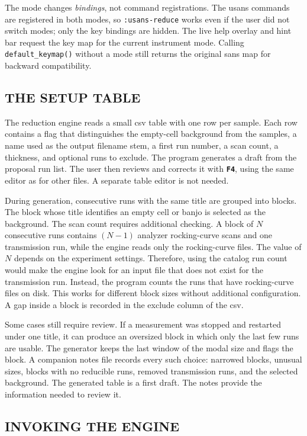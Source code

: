 \documentclass[tm]{ornltm}
\newcommand{\key}[1]{\textbf{\texttt{#1}}}
\begin{document}
The mode changes \emph{bindings}, not command registrations. The \ac{usans}
commands are registered in both modes, so \texttt{:usans-reduce} works even if
the user did not switch modes; only the key bindings are hidden. The live help
overlay and hint bar request the key map for the current instrument mode.
Calling \texttt{default\_keymap()} without a mode still returns the original
\ac{sans} map for backward compatibility.

\subsection{THE SETUP TABLE}

The reduction engine reads a small \ac{csv} table with one row per sample. Each
row contains a flag that distinguishes the empty-cell background from the
samples, a name used as the output filename stem, a first run number, a scan
count, a thickness, and optional runs to exclude. The program generates a draft
from the proposal run list. The user then reviews and corrects it with \key{F4},
using the same editor as for other files. A separate table editor is not needed.

During generation, consecutive runs with the same title are grouped into blocks.
The block whose title identifies an empty cell or banjo is selected as the
background. The scan count requires additional checking. A block of $N$
consecutive runs contains $(N-1)$ analyzer rocking-curve scans and one
transmission run, while the engine reads only the rocking-curve files. The value
of $N$ depends on the experiment settings. Therefore, using the catalog run
count would make the engine look for an input file that does not exist for the
transmission run. Instead, the program counts the runs that have rocking-curve
files on disk. This works for different block sizes without additional
configuration. A gap inside a block is recorded in the exclude column of the
\ac{csv}.

Some cases still require review. If a measurement was stopped and restarted
under one title, it can produce an oversized block in which only the last few
runs are usable. The generator keeps the last window of the modal size and flags
the block. A companion notes file records every such choice: narrowed blocks,
unusual sizes, blocks with no reducible runs, removed transmission runs, and the
selected background. The generated table is a first draft. The notes provide
the information needed to review it.

\subsection{INVOKING THE ENGINE}
\end{document}

